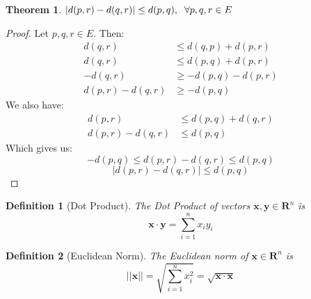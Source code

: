 \documentclass{article}
\newtheorem{definition}{Definition}[section]
\newtheorem{theorem}{Theorem}[section]
\begin{document}
			\begin{theorem}
				$|d(p,r) - d(q,r)| \leq d(p,q), \hspace{2 mm} \forall p,q,r \in E$
			\end{theorem}
			\begin{proof}
				Let $p,q,r \in E$. Then:
				\begin{align*}
					d(q,r) &\leq d(q,p)+d(p,r) \tag{Subadditivity}\\
					d(q,r) &\leq d(p,q)+d(p,r) \tag{Symmetry}\\
					-d(q,r) &\geq -d(p,q)-d(p,r)\\
					d(p,r)-d(q,r) &\geq -d(p,q)
				\end{align*}
				We also have:
				\begin{align*}
					d(p,r) &\leq d(p,q)+d(q,r) \tag{Subadditivity}\\
					d(p,r)-d(q,r) &\leq d(p,q)
				\end{align*}	
				Which gives us:
				$$-d(p,q) \leq d(p,r)-d(q,r) \leq d(p,q)$$
				$$|d(p,r) - d(q,r)| \leq d(p,q)$$

			\end{proof}

			\begin{definition}[Dot Product]
				The Dot Product of vectors $\bm{x}, \bm{y} \in \mathbf{R}^n$ is $$\bm{x} \cdot \bm{y} = \sum\limits_{i=1}^n x_i y_i$$
			\end{definition}

			\begin{definition}[Euclidean Norm]
				The Euclidean norm of $\bm{x} \in \mathbf{R}^n$ is $$||\bm{x}|| = \sqrt{\sum\limits_{i=1}^n x_i^2} = \sqrt{\bm{x} \cdot \bm{x}}$$
			\end{definition}
\end{document}
